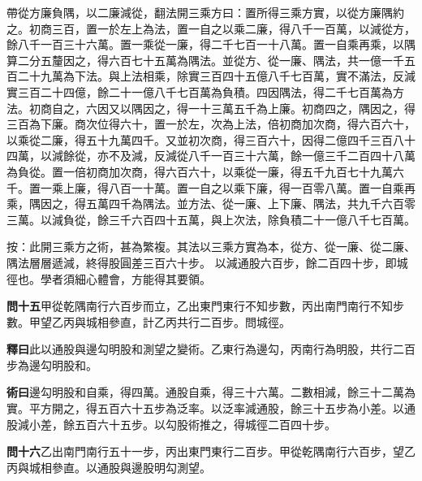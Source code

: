 \documentclass[12pt,a4paper]{article}
\begin{document}
\vspace{0.3em}

帶從方廉負隅，以二廉減從，翻法開三乘方曰：置所得三乘方實，以從方廉隅約之。初商三百，置一於左上為法，置一自之以乘二廉，得八千一百萬，以減從方，餘八千一百三十六萬。置一乘從一廉，得二千七百一十八萬。置一自乘再乘，以隅算二分五釐因之，得六百七十五萬為隅法。並從方、從一廉、隅法，共一億一千五百二十九萬為下法。與上法相乘，除實三百四十五億八千七百萬，實不滿法，反減實三百二十四億，餘二十一億八千七百萬為負積。四因隅法，得二千七百萬為方法。初商自之，六因又以隅因之，得一十三萬五千為上廉。初商四之，隅因之，得三百為下廉。商次位得六十，置一於左，次為上法，倍初商加次商，得六百六十，以乘從二廉，得五十九萬四千。又並初次商，得三百六十，因得二億四千三百八十四萬，以減餘從，亦不及減，反減從八千一百三十六萬，餘一億三千二百四十八萬為負從。置一倍初商加次商，得六百六十，以乘從一廉，得五千九百七十九萬六千。置一乘上廉，得八百一十萬。置一自之以乘下廉，得一百零八萬。置一自乘再乘，隅因之，得五萬四千為隅法。並方法、從一廉、上下廉、隅法，共九千六百零三萬。以減負從，餘三千六百四十五萬，與上次法，除負積二十一億八千七百萬。

\vspace{0.5em}

\noindent
按：此開三乘方之術，甚為繁複。其法以三乘方實為本，從方、從一廉、從二廉、隅法層層遞減，終得股圓差三百六十步。
以減通股六百步，餘二百四十步，即城徑也。學者須細心體會，方能得其要領。

\vspace{0.5em}

\noindent\textbf{問十五}\quad 甲從乾隅南行六百步而立，乙出東門東行不知步數，丙出南門南行不知步數。甲望乙丙與城相參直，計乙丙共行二百步。問城徑。

\vspace{0.3em}

\noindent\textbf{釋曰}\quad 此以通股與邊勾明股和測望之變術。乙東行為邊勾，丙南行為明股，共行二百步為邊勾明股和。

\vspace{0.3em}

\noindent\textbf{術曰}\quad 邊勾明股和自乘，得四萬。通股自乘，得三十六萬。二數相減，餘三十二萬為實。平方開之，得五百六十五步為泛率。以泛率減通股，餘三十五步為小差。以通股減小差，餘五百六十五步。以勾股術推之，得城徑二百四十步。

\vspace{0.5em}

\noindent\textbf{問十六}\quad 乙出南門南行五十一步，丙出東門東行二百步。甲從乾隅南行六百步，望乙丙與城相參直。以通股與邊股明勾測望。
\end{document}
